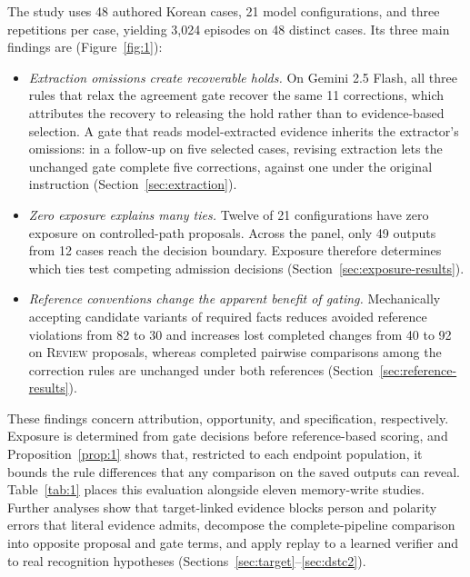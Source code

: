 \documentclass[acmsmall,review]{acmart}
\newcommand{\review}{\textsc{Review}}
\begin{document}
The study uses 48 authored Korean cases, 21 model configurations, and three repetitions per case, yielding 3,024 episodes on 48 distinct cases. Its three main findings are (Figure~\ref{fig:1}):
\begin{itemize}
\item \emph{Extraction omissions create recoverable holds.} On Gemini 2.5 Flash, all three rules that relax the agreement gate recover the same 11 corrections, which attributes the recovery to releasing the hold rather than to evidence-based selection. A gate that reads model-extracted evidence inherits the extractor's omissions: in a follow-up on five selected cases, revising extraction lets the unchanged gate complete five corrections, against one under the original instruction (Section~\ref{sec:extraction}).
\item \emph{Zero exposure explains many ties.} Twelve of 21 configurations have zero exposure on controlled-path proposals. Across the panel, only 49 outputs from 12 cases reach the decision boundary. Exposure therefore determines which ties test competing admission decisions (Section~\ref{sec:exposure-results}).
\item \emph{Reference conventions change the apparent benefit of gating.} Mechanically accepting candidate variants of required facts reduces avoided reference violations from 82 to 30 and increases lost completed changes from 40 to 92 on \review{} proposals, whereas completed pairwise comparisons among the correction rules are unchanged under both references (Section~\ref{sec:reference-results}).
\end{itemize}

These findings concern attribution, opportunity, and specification, respectively. Exposure is determined from gate decisions before reference-based scoring, and Proposition~\ref{prop:1} shows that, restricted to each endpoint population, it bounds the rule differences that any comparison on the saved outputs can reveal. Table~\ref{tab:1} places this evaluation alongside eleven memory-write studies. Further analyses show that target-linked evidence blocks person and polarity errors that literal evidence admits, decompose the complete-pipeline comparison into opposite proposal and gate terms, and apply replay to a learned verifier and to real recognition hypotheses (Sections~\ref{sec:target}--\ref{sec:dstc2}).
\end{document}
